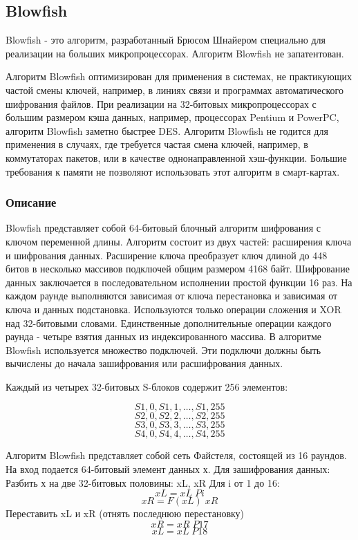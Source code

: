 \subsection{Blowfish}
Blowfish - это алгоритм, разработанный Брюсом Шнайером специально для реализации на больших микропроцессорах. Алгоритм Blowfish не запатентован.

Алгоритм Blowfish оптимизирован для применения в системах, не практикующих частой смены ключей, например, в линиях связи и программах автоматического шифрования файлов. При реализации на 32-битовых микропроцессорах с большим размером кэша данных, например, процессорах Pentium и PowerPC, алгоритм Blowfish заметно быстрее DES. Алгоритм Blowfish не годится для применения в случаях, где требуется частая смена ключей, например, в коммутаторах пакетов, или в качестве однонаправленной хэш-функции. Большие требования к памяти не позволяют использовать этот алгоритм в смарт-картах.

\subsubsection{Описание}

Blowfish представляет собой 64-битовый блочный алгоритм шифрования с ключом переменной длины. Алгоритм состоит из двух частей: расширения ключа и шифрования данных. Расширение ключа преобразует ключ длиной до 448 битов в несколько массивов подключей общим размером 4168 байт.
Шифрование данных заключается в последовательном исполнении простой функции 16 раз. На каждом раунде выполняются зависимая от ключа перестановка и зависимая от ключа и данных подстановка. Используются только операции сложения и XOR над 32-битовыми словами. Единственные дополнительные операции каждого раунда - четыре взятия данных из индексированного массива.
В алгоритме Blowfish используется множество подключей. Эти подключи должны быть вычислены до начала зашифрования или расшифрования данных.

Каждый из четырех 32-битовых S-блоков содержит 256 элементов: 

$$S1,0, S1,1,…, S1,255$$
$$S2,0, S2,2,…, S2,255$$
$$S3,0, S3,3,…, S3,255$$
$$S4,0, S4,4,…, S4,255$$

Алгоритм Blowfish представляет собой сеть Файстеля, состоящей из 16 раундов. На вход подается 64-битовый элемент данных х. Для зашифрования данных:
Разбить  х на  две  32-битовых половины: xL, xR
Для i от 1 до 16:
		$$xL = xL    Pi$$
		$$xR = F (xL)    xR$$
	Переставить xL и xR (отнять последнюю перестановку)
$$xR = xR    P17$$
$$xL = xL    P18$$

